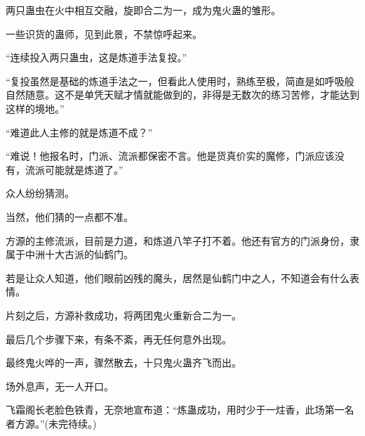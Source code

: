 \begin{this_body}
两只蛊虫在火中相互交融，旋即合二为一，成为鬼火蛊的雏形。

一些识货的蛊师，见到此景，不禁惊呼起来。

“连续投入两只蛊虫，这是炼道手法复投。”

“复投虽然是基础的炼道手法之一，但看此人使用时，熟练至极，简直是如呼吸般自然随意。这不是单凭天赋才情就能做到的，非得是无数次的练习苦修，才能达到这样的境地。”

“难道此人主修的就是炼道不成？”

“难说！他报名时，门派、流派都保密不言。他是货真价实的魔修，门派应该没有，流派可能就是炼道了。”

众人纷纷猜测。

当然，他们猜的一点都不准。

方源的主修流派，目前是力道，和炼道八竿子打不着。他还有官方的门派身份，隶属于中洲十大古派的仙鹤门。

若是让众人知道，他们眼前凶残的魔头，居然是仙鹤门中之人，不知道会有什么表情。

片刻之后，方源补救成功，将两团鬼火重新合二为一。

最后几个步骤下来，有条不紊，再无任何意外出现。

最终鬼火哗的一声，骤然散去，十只鬼火蛊齐飞而出。

场外息声，无一人开口。

飞霜阁长老脸色铁青，无奈地宣布道：“炼蛊成功，用时少于一炷香，此场第一名者方源。”(未完待续。)

\end{this_body}

